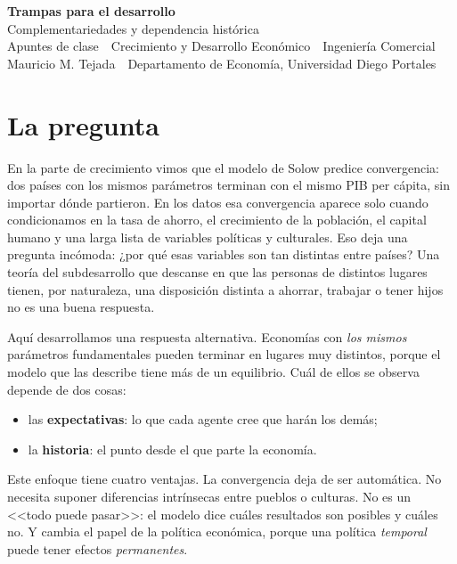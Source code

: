 \documentclass[12pt,letterpaper]{article}
\begin{document}
\begin{center}
  {\LARGE\bfseries\color{udprojo} Trampas para el desarrollo}\\[0.5em]
  {\large Complementariedades y dependencia histórica}\\[0.9em]
  {\small Apuntes de clase \,\textbullet\, Crecimiento y Desarrollo Económico \,\textbullet\, Ingeniería Comercial}\\[0.2em]
  {\small Mauricio M. Tejada \,\textbullet\, Departamento de Economía, Universidad Diego Portales}
\end{center}
\vspace{0.6em}


\section{La pregunta}

En la parte de crecimiento vimos que el modelo de Solow predice convergencia: dos países con los mismos parámetros terminan con el mismo PIB per cápita, sin importar dónde partieron. En los datos esa convergencia aparece solo cuando condicionamos en la tasa de ahorro, el crecimiento de la población, el capital humano y una larga lista de variables políticas y culturales. Eso deja una pregunta incómoda: ¿por qué esas variables son tan distintas entre países? Una teoría del subdesarrollo que descanse en que las personas de distintos lugares tienen, por naturaleza, una disposición distinta a ahorrar, trabajar o tener hijos no es una buena respuesta.

Aquí desarrollamos una respuesta alternativa. Economías con \emph{los mismos} parámetros fundamentales pueden terminar en lugares muy distintos, porque el modelo que las describe tiene más de un equilibrio. Cuál de ellos se observa depende de dos cosas:
\begin{itemize}
  \item las \textbf{expectativas}: lo que cada agente cree que harán los demás;
  \item la \textbf{historia}: el punto desde el que parte la economía.
\end{itemize}
Este enfoque tiene cuatro ventajas. La convergencia deja de ser automática. No necesita suponer diferencias intrínsecas entre pueblos o culturas. No es un <<todo puede pasar>>: el modelo dice cuáles resultados son posibles y cuáles no. Y cambia el papel de la política económica, porque una política \emph{temporal} puede tener efectos \emph{permanentes}.
\end{document}
